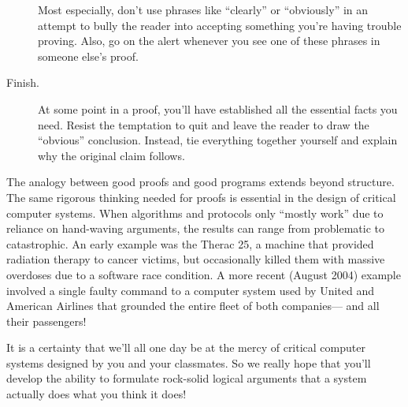 \begin{description}
  Most especially, don't use phrases like ``clearly'' or ``obviously'' in
  an attempt to bully the reader into accepting something you're having
  trouble proving.  Also, go on the alert whenever you see one of these
  phrases in someone else's proof.

\item[Finish.]  At some point in a proof, you'll have established all the
essential facts you need.  Resist the temptation to quit and leave the
reader to draw the ``obvious'' conclusion.  Instead, tie everything
together yourself and explain why the original claim follows.

\end{description}

The analogy between good proofs and good programs extends beyond
structure.  The same rigorous thinking needed for proofs is essential in
the design of critical computer systems.  When algorithms and protocols
only ``mostly work'' due to reliance on hand-waving arguments, the results
can range from problematic to catastrophic.  An early example was the
Therac 25, a machine that provided radiation therapy to cancer victims,
but occasionally killed them with massive overdoses due to a software race
condition.  A more recent (August 2004) example involved a single faulty
command to a computer system used by United and American Airlines that
grounded the entire fleet of both companies--- and all their passengers!

It is a certainty that we'll all one day be at the mercy of critical
computer systems designed by you and your classmates.  So we really
hope that you'll develop the ability to formulate rock-solid logical
arguments that a system actually does what you think it does!


\endinput
